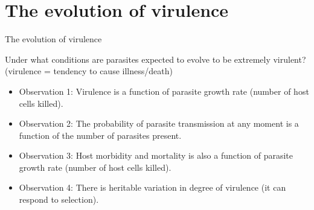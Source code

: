 \section[The evolution of virulence]{The evolution of virulence}

\begin{frame}[t]
    \begin{adjustwidth}{-2em}{-1.5em}
        The evolution of virulence

        \vspace{2mm}
        Under what conditions are parasites expected to evolve to be extremely
        virulent? (virulence = tendency to cause illness/death)

        \begin{itemize}
            \item<2-> Observation 1: Virulence is a function of parasite growth
                rate (number of host cells killed).

                \vspace{5mm}
            \item<3-> Observation 2: The probability of parasite transmission
                at any moment is a function of the number of parasites present.

                \vspace{5mm}
            \item<4-> Observation 3: Host morbidity and mortality is also a
                function of parasite growth rate (number of host cells killed).

                \vspace{5mm}
            \item<5-> Observation 4: There is heritable variation in degree of
                virulence (it can respond to selection).
        \end{itemize}

    \end{adjustwidth}
\end{frame}

